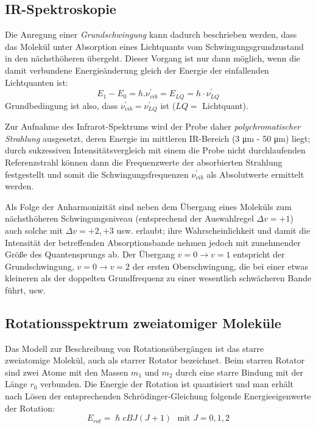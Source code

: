 \documentclass[12pt]{article}
\begin{document}
\subsection{IR-Spektroskopie}
Die Anregung einer \textit{Grundschwingung} kann dadurch beschrieben werden,
dass das Molekül unter Absorption eines Lichtquants vom 
Schwingungsgrundzustand in den nächsthöheren übergeht.
Dieser Vorgang ist nur dann möglich, 
wenn die damit verbundene Energieänderung 
gleich der Energie der einfallenden Lichtquanten ist:
\begin{equation}
  E _1 - E_0 = h. \nu ^{'}_{vib} = E _{LQ} = h \cdot \nu ^{'}_{LQ}
\end{equation}
Grundbedingung ist also, dass $\nu ^{'}_{vib} = \nu ^{'}_{LQ} $ ist ($LQ =$ Lichtquant). \par
Zur Aufnahme des Infrarot-Spektrums wird der Probe daher \textit{polychromatischer Strahlung} ausgesetzt,
deren Energie im mittleren IR-Bereich (3 \si{\micro\meter} -
50 \si{\micro\meter}) liegt; durch sukzessiven
Intensitätsvergleich mit einem die Probe nicht durchlaufenden Referenzstrahl können dann die Frequenzwerte
der absorbierten Strahlung festgestellt und somit die Schwingungsfrequenzen $\nu ^{'}_{vib} $ als Absolutwerte
ermittelt werden. \par
Als Folge der Anharmonizität sind neben dem Übergang eines Moleküls zum nächsthöheren Schwingungsniveau
(entsprechend der Auswahlregel $ \Delta v = +1$) auch solche mit $ \Delta v = +2, +3$ usw. erlaubt;
ihre Wahrscheinlichkeit und damit die Intensität der betreffenden Absorptionsbande nehmen
jedoch mit zunehmender Größe des Quantensprungs ab. Der Übergang $v =0 \rightarrow v =1$ entspricht der Grundschwingung,
$ v =0 \rightarrow v=2 $ der ersten Oberschwingung, die bei einer etwas kleineren als der doppelten Grundfrequenz
zu einer wesentlich schwächeren Bande führt, usw.
\subsection{Rotationsspektrum zweiatomiger Moleküle~\supercite{rovib}}
Das Modell zur Beschreibung von Rotationsübergängen 
ist das starre zweiatomige Molekül, auch als starrer Rotator bezeichnet. 
Beim starren Rotator sind zwei Atome mit den Massen $m_1$ und $m_2$ 
durch eine starre Bindung mit der Länge $r_0$ verbunden. 
Die Energie der Rotation ist quantisiert und man erhält nach Lösen 
der entsprechenden Schrödinger-Gleichung folgende Energieeigenwerte der Rotation:
\begin{equation}
\label{eq:erot}
E_{rot} = \hslash c B J (J+1) \,\, \text{ mit } J = 0, 1,2 
\end{equation}
\end{document}
